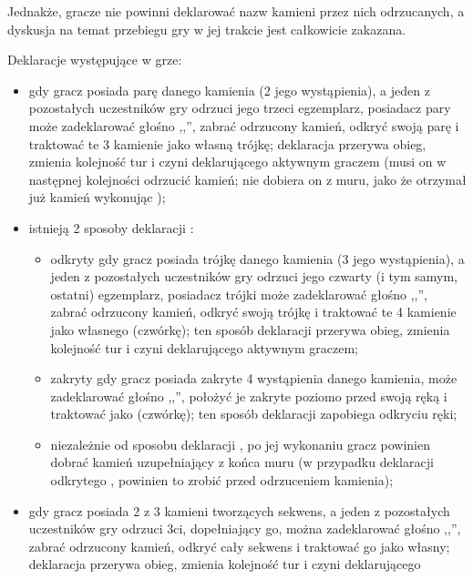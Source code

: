 Jednakże, gracze nie powinni deklarować nazw kamieni przez nich odrzucanych, a
dyskusja na temat przebiegu gry w jej trakcie jest całkowicie zakazana.

Deklaracje występujące w grze: 
\begin{itemize}
  \item {}
  gdy gracz posiada parę danego kamienia (2 jego wystąpienia), a jeden z
  pozostałych uczestników gry odrzuci jego trzeci egzemplarz, posiadacz pary
  może zadeklarować głośno ,,'', zabrać odrzucony kamień, odkryć
  swoją parę i traktować te 3 kamienie jako własną trójkę; deklaracja
   przerywa obieg, zmienia kolejność tur i czyni deklarującego
  aktywnym graczem (musi on w następnej kolejności odrzucić kamień; nie dobiera
  on z muru, jako że otrzymał już kamień wykonując );
  \item {}
  istnieją 2 sposoby deklaracji :
    \begin{itemize}
    \item odkryty 
    gdy gracz posiada trójkę danego kamienia (3 jego wystąpienia), a jeden z
    pozostałych uczestników gry odrzuci jego czwarty (i tym samym, ostatni)
    egzemplarz, posiadacz trójki może zadeklarować głośno ,,'',
    zabrać odrzucony kamień, odkryć swoją trójkę i traktować te 4 kamienie jako
    własnego  (czwórkę); ten sposób deklaracji 
    przerywa obieg, zmienia kolejność tur i czyni deklarującego aktywnym graczem;
    \item zakryty 
    gdy gracz posiada zakryte 4 wystąpienia danego kamienia, może zadeklarować
    głośno ,,'', położyć je zakryte poziomo przed swoją ręką i
    traktować jako  (czwórkę); ten sposób deklaracji zapobiega
    odkryciu ręki;
    \item niezależnie od sposobu deklaracji , po jej wykonaniu
    gracz powinien dobrać kamień uzupełniający z końca muru (w przypadku
    deklaracji odkrytego , powinien to zrobić przed odrzuceniem
    kamienia);
    \end{itemize}
  \item {}
  gdy gracz posiada 2 z 3 kamieni tworzących sekwens, a jeden z pozostałych
  uczestników gry odrzuci 3ci, dopełniający go, można zadeklarować
  głośno ,,'', zabrać odrzucony kamień, odkryć cały sekwens i
  traktować go jako własny; deklaracja
   przerywa obieg, zmienia kolejność tur i czyni deklarującego

\end{itemize}
